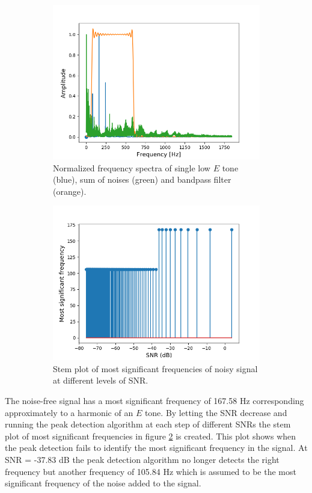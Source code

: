 \begin{figure}[H]
\begin{subfigure}{0.49\textwidth}
\centering
\includegraphics[width=\textwidth]{figures/SNR/single_spectrum.png}
\caption{Normalized frequency spectra of single low $E$ tone (blue), sum of noises (green) and bandpass filter (orange).}
\label{fig:single_spectrum}
\end{subfigure}
\begin{subfigure}{0.49\textwidth}
\centering
\includegraphics[width=\textwidth]{figures/SNR/single_stem.png}
\caption{Stem plot of most significant frequencies of noisy signal at different levels of SNR.}
\label{fig:single_stem}
\end{subfigure}
\caption{}
\label{fig:single_noise}
\end{figure}
The noise-free signal has a most significant frequency of 167.58 Hz corresponding approximately to a harmonic of an $E$ tone. By letting the SNR decrease and running the peak detection algorithm at each step of different SNRs the stem plot of most significant frequencies in figure \ref{fig:single_stem} is created. This plot shows when the peak detection fails to identify the most significant frequency in the signal. At SNR = -37.83 dB the peak detection algorithm no longer detects the right frequency but another frequency of 105.84 Hz which is assumed to be the most significant frequency of the noise added to the signal.

